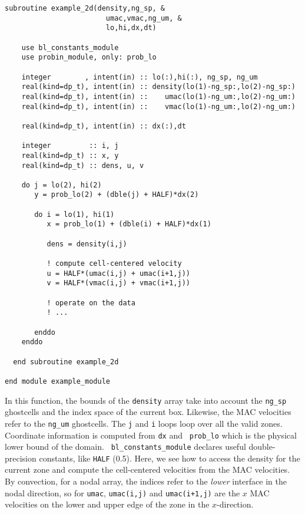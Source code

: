 \begin{lstlisting}[language={[95]fortran},mathescape=false]
  subroutine example_2d(density,ng_sp, &
                        umac,vmac,ng_um, &
                        lo,hi,dx,dt)

    use bl_constants_module
    use probin_module, only: prob_lo

    integer        , intent(in) :: lo(:),hi(:), ng_sp, ng_um
    real(kind=dp_t), intent(in) :: density(lo(1)-ng_sp:,lo(2)-ng_sp:)
    real(kind=dp_t), intent(in) ::    umac(lo(1)-ng_um:,lo(2)-ng_um:)
    real(kind=dp_t), intent(in) ::    vmac(lo(1)-ng_um:,lo(2)-ng_um:)

    real(kind=dp_t), intent(in) :: dx(:),dt

    integer         :: i, j
    real(kind=dp_t) :: x, y
    real(kind=dp_t) :: dens, u, v

    do j = lo(2), hi(2)
       y = prob_lo(2) + (dble(j) + HALF)*dx(2)

       do i = lo(1), hi(1)
          x = prob_lo(1) + (dble(i) + HALF)*dx(1)

          dens = density(i,j)

          ! compute cell-centered velocity
          u = HALF*(umac(i,j) + umac(i+1,j))
          v = HALF*(vmac(i,j) + vmac(i+1,j))

          ! operate on the data
          ! ...

       enddo
    enddo

  end subroutine example_2d

end module example_module
\end{lstlisting}

\noindent In this function, the bounds of the {\tt density} array take
into account the {\tt ng\_sp} ghostcells and the index space of the
current box.  Likewise, the MAC velocities refer to the {\tt ng\_um}
ghostcells.  The {\tt j} and {\tt i} loops loop over all the valid
zones.  Coordinate information is computed from {\tt dx} and {\tt
  prob\_lo} which is the physical lower bound of the domain.  {\tt
  bl\_constants\_module} declares useful double-precision constants,
like {\tt HALF} (0.5).  Here, we see how to access the density for
the current zone and compute the cell-centered velocities from the
MAC velocities.  By convection, for a nodal array, the indices refer 
to the {\em lower} interface in the nodal direction, so for {\tt umac},
{\tt umac(i,j)} and {\tt umac(i+1,j)} are the $x$ MAC velocities
on the lower and upper edge of the zone in the $x$-direction.

